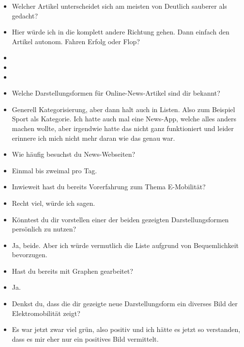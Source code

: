 {\begin{itemize}[]
                  Deswegen gehe ich mal weiter nach unten.
                  Also von mir aus einfach \flqq Rohstoffe für E-Auto Akku\frqq{}.
            \item {} Welcher Artikel unterscheidet sich am meisten von \flqq Deutlich sauberer als gedacht\frqq{}?
            \item {} Hier würde ich in die komplett andere Richtung gehen.
                  Dann einfach den Artikel \flqq autonom. Fahren Erfolg oder Flop?\frqq{}
            \item {}
            \item {}
            \item {}
            \item {} Welche Darstellungsformen für Online-News-Artikel sind dir bekannt?
            \item {} Generell Kategorisierung, aber dann halt auch in Listen. Also zum Beispiel Sport als Kategorie.
                  Ich hatte auch mal eine News-App, welche alles anders machen wollte, aber irgendwie hatte das nicht ganz funktioniert und leider erinnere ich mich nicht mehr daran wie das genau war.
            \item {} Wie häufig besuchst du News-Webseiten?
            \item {} Einmal bis zweimal pro Tag.
            \item {} Inwieweit hast du bereits Vorerfahrung zum Thema E-Mobilität?
            \item {} Recht viel, würde ich sagen.
            \item {} Könntest du dir vorstellen einer der beiden gezeigten Darstellungsformen persönlich zu nutzen?
            \item {} Ja, beide. Aber ich würde vermutlich die Liste aufgrund von Bequemlichkeit bevorzugen.
            \item {} Hast du bereits mit Graphen gearbeitet?
            \item {} Ja.
            \item {} Denkst du, dass die dir gezeigte neue Darstellungsform ein diverses Bild der Elektromobilität zeigt?
            \item {} Es war jetzt zwar viel grün, also positiv und ich hätte es jetzt so verstanden, dass es mir eher nur ein positives Bild vermittelt.

\end{itemize}}
